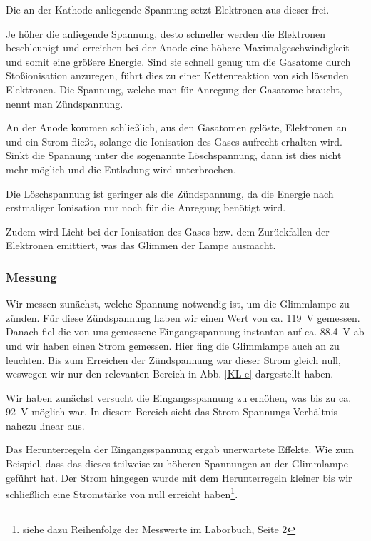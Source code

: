 \documentclass[11pt,a4paper,titlepage, ngerman]{article}
\begin{document}
				Die an der Kathode anliegende Spannung setzt Elektronen aus dieser frei.

				Je höher die anliegende Spannung, desto schneller werden die Elektronen beschleunigt und erreichen bei der Anode eine höhere Maximalgeschwindigkeit und somit eine größere Energie.
				Sind sie schnell genug um die Gasatome durch Stoßionisation anzuregen, führt dies zu einer Kettenreaktion von sich lösenden Elektronen.
				Die Spannung, welche man für Anregung der Gasatome braucht, nennt man Zündspannung. 
				
				An der Anode kommen schließlich, aus den Gasatomen gelöste, Elektronen an und ein Strom fließt, solange die Ionisation des Gases aufrecht erhalten wird.
				Sinkt die Spannung unter die sogenannte Löschspannung, dann ist dies nicht mehr möglich und die Entladung wird unterbrochen.

				Die Löschspannung ist geringer als die Zündspannung, da die Energie nach erstmaliger Ionisation nur noch für die Anregung benötigt wird.
					
				Zudem wird Licht bei der Ionisation des Gases bzw. dem Zurückfallen der Elektronen emittiert, was das \glqq Glimmen\grqq{} der Lampe ausmacht.
				
			\subsubsection*{Messung}
			
				Wir messen zunächst, welche Spannung notwendig ist, um die Glimmlampe zu zünden.
				Für diese Zündspannung haben wir einen Wert von ca. \SI{119}{\V} gemessen.
				Danach fiel die von uns gemessene Eingangsspannung instantan auf ca. \SI{88,4}{\V} ab und wir haben einen Strom gemessen.
				Hier fing die Glimmlampe auch an zu leuchten.
				Bis zum Erreichen der Zündspannung war dieser Strom gleich null, weswegen wir nur den relevanten Bereich in Abb. \ref{KL e} dargestellt haben.
				
				Wir haben zunächst versucht die Eingangsspannung zu erhöhen, was bis zu ca. \SI{92}{\V} möglich war. In diesem Bereich sieht das Strom-Spannungs-Verhältnis nahezu linear aus.
				
				Das Herunterregeln der Eingangsspannung ergab unerwartete Effekte. Wie zum Beispiel, dass das dieses teilweise zu höheren Spannungen an der Glimmlampe geführt hat.				
				Der Strom hingegen wurde mit dem Herunterregeln kleiner bis wir schließlich eine Stromstärke von null erreicht haben\footnote{siehe dazu Reihenfolge der Messwerte im Laborbuch, Seite 2}.
\end{document}
